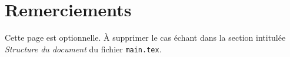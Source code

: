 \chapter*{Remerciements}

\textcolor{eclipsepurple}{Cette page est optionnelle. À supprimer le cas échant dans la section intitulée \textit{Structure du document} du fichier \texttt{main.tex}}.

\lipsum[1-2] %

